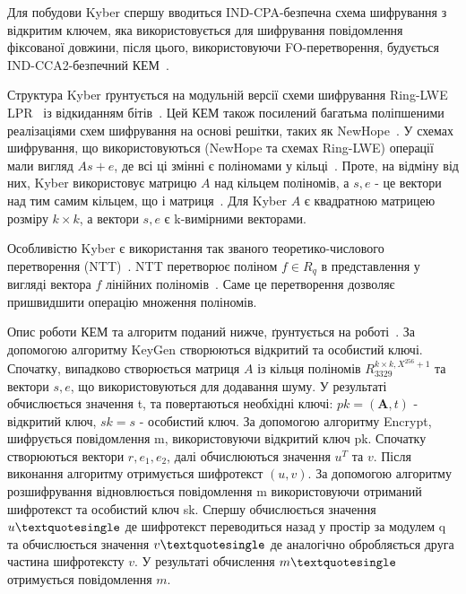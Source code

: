 Для побудови Kyber спершу вводиться IND-CPA-безпечна схема шифрування з відкритим ключем, яка використовується для шифрування повідомлення фіксованої довжини, після цього, використовуючи FO-перетворення, будується IND-CCA2-безпечний КЕМ~\cite{KyberWebsite}.

Структура Kyber ґрунтується на модульній версії схеми шифрування Ring-LWE LPR~\cite{Lyubashevsky2013, Langlois2012} із відкиданням бітів~\cite{Pessl2017}. Цей КЕМ також посилений багатьма поліпшеними реалізаціями схем шифрування на основі решітки, таких як NewHope~\cite{Alkim2016}. У схемах шифрування, що використовуються (NewHope та схемах Ring-LWE) операції мали вигляд $As+e$, де всі ці змінні є поліномами у кільці~\cite{Avanzi2021}. Проте, на відміну від них, Kyber використовує матрицю $A$ над кільцем поліномів, а $s, e$ - це вектори над тим самим кільцем, що і матриця~\cite{Avanzi2021}. Для Kyber $A$ є квадратною матрицею розміру $k\times k$, а вектори $s, e$ є k-вимірними векторами.  

Особливістю Kyber є використання так званого теоретико-числового перетворення (NTT)~\cite{Botros2019}. NTT перетворює поліном $f \in R_q$ в представлення у вигляді вектора $f$ лінійних поліномів~\cite{Botros2019}. Саме це перетворення дозволяє пришвидшити операцію множення поліномів. 


Опис роботи КЕМ та алгоритм поданий нижче, ґрунтується на роботі~\cite{Lyubashevsky2024}.
За допомогою алгоритму KeyGen створюються відкритий та особистий ключі. Спочатку, випадково створюється матриця $A$ із кільця поліномів ${R}_{3329}^{k \times k, X^{256}+1}$ та вектори $s, e$, що використовуються для додавання шуму. У результаті обчислюється значення t, та повертаються необхідні ключі: $pk = (\mathbf{A}, t)$ - відкритий ключ,  $sk = s$ - особистий ключ. За допомогою алгоритму Encrypt, шифрується повідомлення m, використовуючи відкритий ключ pk. Спочатку створюються вектори $r, e_1, e_2$, далі обчислюються значення $u^T$ та $v$. Після виконання алгоритму отримується шифротекст $(u, v)$. За допомогою алгоритму розшифрування відновлюється  повідомлення m використовуючи отриманий шифротекст та особистий ключ sk. Спершу обчислюється значення $u\textquotesingle$ де шифротекст переводиться назад у простір за модулем q та обчислюється значення $v\textquotesingle$ де аналогічно обробляється друга частина шифротексту $v$. У результаті обчислення $m\textquotesingle$ отримується повідомлення $m$. 

